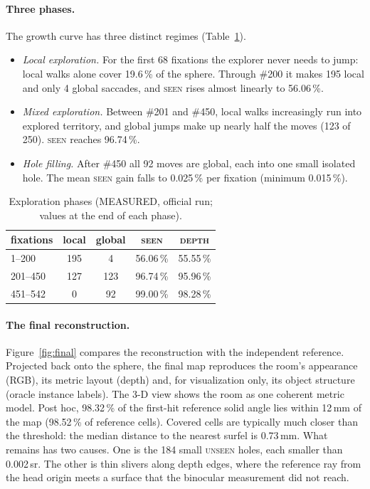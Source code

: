 \documentclass[11pt,a4paper]{article}
\newcommand{\pct}[1]{#1\,\%}
\begin{document}
\paragraph{Three phases.} The growth curve has three distinct regimes (Table~\ref{tab:phases}).
\begin{itemize}
  \item \emph{Local exploration.} For the first 68 fixations the explorer never needs to jump: local walks alone
        cover \pct{19.6} of the sphere. Through \#200 it makes 195 local and only 4 global saccades, and
        \textsc{seen} rises almost linearly to \pct{56.06}.
  \item \emph{Mixed exploration.} Between \#201 and \#450, local walks increasingly run into explored territory, and
        global jumps make up nearly half the moves (123 of 250). \textsc{seen} reaches \pct{96.74}.
  \item \emph{Hole filling.} After \#450 all 92 moves are global, each into one small isolated hole. The mean
        \textsc{seen} gain falls to \pct{0.025} per fixation (minimum \pct{0.015}).
\end{itemize}

\begin{table}[h]
\centering\small
\caption{Exploration phases (MEASURED, official run; values at the end of each phase).}
\label{tab:phases}
\begin{tabular}{@{}l c c c c@{}}
\toprule
fixations & local & global & \textsc{seen} & \textsc{depth} \\
\midrule
1--200   & 195 & 4   & \pct{56.06} & \pct{55.55} \\
201--450 & 127 & 123 & \pct{96.74} & \pct{95.96} \\
451--542 & 0   & 92  & \pct{99.00} & \pct{98.28} \\
\bottomrule
\end{tabular}
\end{table}

\paragraph{The final reconstruction.} Figure~\ref{fig:final} compares the reconstruction with the independent reference.
Projected back onto the sphere, the final map reproduces the room's appearance (RGB), its metric layout (depth) and,
for visualization only, its object structure (oracle instance labels). The 3-D view shows the room as one coherent
metric model. Post hoc, \pct{98.32} of the first-hit reference solid angle lies within 12\,mm of the map
(\pct{98.52} of reference cells). Covered cells are typically much closer than the threshold: the median distance to
the nearest surfel is 0.73\,mm. What remains has two causes. One is the 184 small \textsc{unseen} holes, each smaller
than 0.002\,sr. The other is thin slivers along depth edges, where the reference ray from the head origin meets a
surface that the binocular measurement did not reach.
\end{document}
